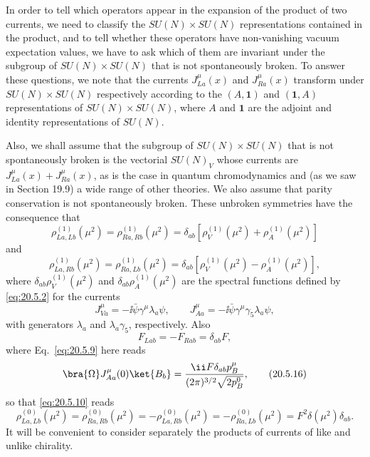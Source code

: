 In order to tell which operators appear in the expansion of the product of two currents, we need to classify the $SU(N)\times SU(N)$ representations contained in the product, and to tell whether these operators have non-vanishing vacuum expectation values, we have to ask which of them are invariant under the subgroup of $SU(N)\times SU(N)$ that is not spontaneously broken. To answer these questions, we note that the currents $J_{La}^\mu(x)$ and $J_{Ra}^\mu(x)$ transform under $SU(N)\times SU(N)$ respectively according to the $(A,\mathbf{1})$ and $(\mathbf{1},A)$ representations of $SU(N)\times SU(N)$, where $A$ and $\mathbf{1}$ are the adjoint and identity representations of $SU(N)$.

Also, we shall assume that the subgroup of $SU(N)\times SU(N)$ that is not spontaneously broken is the vectorial $SU(N)_V$ whose currents are $J_{La}^\mu(x)+J_{Ra}^\mu(x)$, as is the case in quantum chromodynamics and (as we saw in Section 19.9) a wide range of other theories. We also assume that parity conservation is not spontaneously broken. These unbroken symmetries have the consequence that
\begin{equation}
\rho_{La,Lb}^{(1)}(\mu^2)
=\rho_{Ra,Rb}^{(1)}(\mu^2)
=\delta_{ab}\left[
\rho_V^{(1)}(\mu^2)+\rho_A^{(1)}(\mu^2)
\right]
\tag{20.5.12}\label{eq:20.5.12}
\end{equation}
and
\begin{equation}
\rho_{La,Rb}^{(1)}(\mu^2)
=\rho_{Ra,Lb}^{(1)}(\mu^2)
=\delta_{ab}\left[
\rho_V^{(1)}(\mu^2)-\rho_A^{(1)}(\mu^2)
\right],
\tag{20.5.13}\label{eq:20.5.13}
\end{equation}
where $\delta_{ab}\rho_V^{(1)}(\mu^2)$ and $\delta_{ab}\rho_A^{(1)}(\mu^2)$ are the spectral functions defined by \eqref{eq:20.5.2} for the currents
\begin{equation}
J_{Va}^\mu=-\ii\bar\psi\gamma^\mu\lambda_a\psi,
\qquad
J_{Aa}^\mu=-\ii\bar\psi\gamma^\mu\gamma_5\lambda_a\psi,
\tag{20.5.14}\label{eq:20.5.14}
\end{equation}
with generators $\lambda_a$ and $\lambda_a\gamma_5$, respectively. Also
\begin{equation}
F_{Lab}=-F_{Rab}=\delta_{ab}F,
\tag{20.5.15}\label{eq:20.5.15}
\end{equation}
where Eq.~\eqref{eq:20.5.9} here reads
\begin{equation}
\bra{\Omega}J_{Aa}^\mu(0)\ket{B_b}
=\frac{\ii F\delta_{ab}p_B^\mu}{(2\pi)^{3/2}\sqrt{2p_B^0}},
\tag{20.5.16}\label{eq:20.5.16}
\end{equation}
so that \eqref{eq:20.5.10} reads
\begin{equation}
\rho_{La,Lb}^{(0)}(\mu^2)
=\rho_{Ra,Rb}^{(0)}(\mu^2)
=-\rho_{La,Rb}^{(0)}(\mu^2)
=-\rho_{Ra,Lb}^{(0)}(\mu^2)
=F^2\delta(\mu^2)\delta_{ab}.
\tag{20.5.17}\label{eq:20.5.17}
\end{equation}
It will be convenient to consider separately the products of currents of like and unlike chirality.

